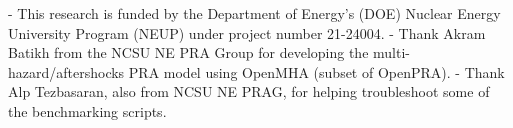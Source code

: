 \begin{acknowledgments}
- This research is funded by the Department of Energy’s (DOE) Nuclear Energy University Program (NEUP) under project number 21-24004.
- Thank Akram Batikh from the NCSU NE PRA Group for developing the multi-hazard/aftershocks PRA model using OpenMHA (subset of OpenPRA).
- Thank Alp Tezbasaran, also from NCSU NE PRAG, for helping troubleshoot some of the benchmarking scripts.
\end{acknowledgments}